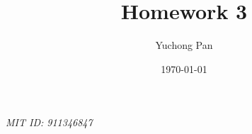 \documentclass[letterpaper, reqno,11pt]{article}
\begin{document}
\title{Homework 3}
\author{Yuchong Pan}
\date{\today}
\newtheorem{theorem}{Theorem}
\newtheorem{lemma}[theorem]{Lemma}
\newtheorem{corollary}[theorem]{Corollary}
\newtheorem{fact}[theorem]{Fact}
\newtheorem{proposition}[theorem]{Proposition}
\newtheorem{claim}{Claim}
\newtheorem{exercise}{Exercise}
\theoremstyle{definition}
\newtheorem{definition}[theorem]{Definition}
\newtheorem{solution}{Solution}
%

\begin{framed}
 \hfill \thedate
\begin{center}
\Large{\thetitle}
\end{center}
 \hfill {\em MIT ID: 911346847}
\end{framed}
\end{document}

